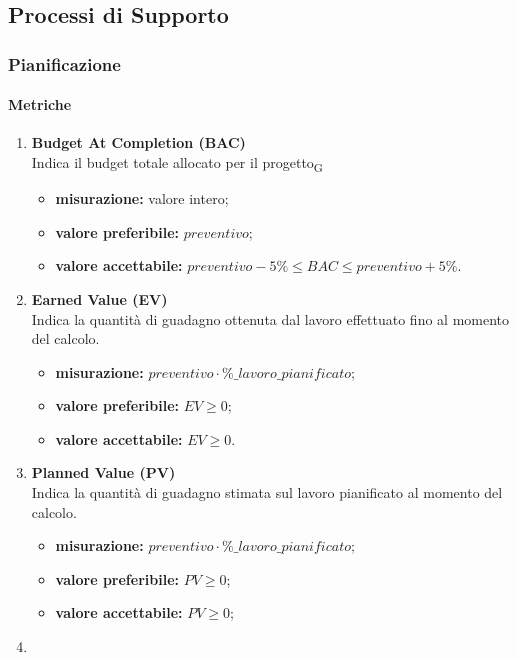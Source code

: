 \subsection{Processi di Supporto}
\subsubsection{Pianificazione}
\paragraph{Metriche}
\begin{enumerate}
	\item[]
	      \textbf{Budget At Completion (BAC)}\\
	      Indica il budget totale allocato per il progetto\textsubscript{G}
	      \begin{itemize}
		      \item \textbf{misurazione:} valore intero;
		      \item \textbf{valore preferibile:} $preventivo$;
		      \item \textbf{valore accettabile:} $preventivo-5\%\leq BAC\leq preventivo+5\%$.
	      \end{itemize}
	\item[]
	      \textbf{Earned Value (EV)}\\
	      Indica la quantità di guadagno ottenuta dal lavoro effettuato fino al momento del calcolo.
	      \begin{itemize}
		      \item \textbf{misurazione:} $preventivo\cdot \%\_lavoro\_pianificato$;
		      \item \textbf{valore preferibile:} $EV\geq 0$;
		      \item \textbf{valore accettabile:} $EV\geq 0$.
	      \end{itemize}
	\item[]
	      \textbf{Planned Value (PV)}\\
	      Indica la quantità di guadagno stimata sul lavoro pianificato al momento del calcolo.
	      \begin{itemize}
		      \item \textbf{misurazione:} $preventivo \cdot \%\_lavoro\_pianificato$;
		      \item \textbf{valore preferibile:} $PV\geq 0$;
		      \item \textbf{valore accettabile:} $PV\geq 0$;
	      \end{itemize}
	\item[]

\end{enumerate}
